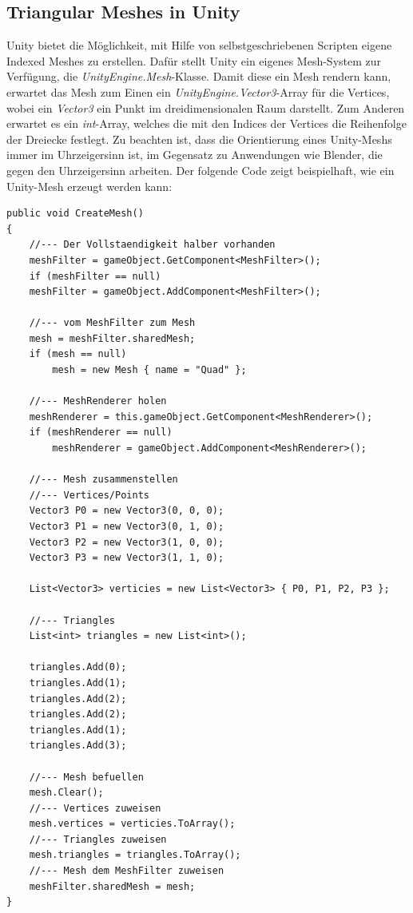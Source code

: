 \subsection{Triangular Meshes in Unity}
Unity bietet die M\"oglichkeit, mit Hilfe von selbstgeschriebenen Scripten eigene Indexed Meshes zu erstellen. Daf\"ur stellt Unity ein eigenes Mesh-System zur Verf\"ugung, die \textit{UnityEngine.Mesh}-Klasse. Damit diese ein Mesh rendern kann, erwartet das Mesh zum Einen ein \textit{UnityEngine.Vector3}-Array f\"ur die Vertices, wobei ein \textit{Vector3} ein Punkt im dreidimensionalen Raum darstellt. Zum Anderen erwartet es ein \textit{int}-Array, welches die mit den Indices der Vertices die Reihenfolge der Dreiecke festlegt. Zu beachten ist, dass die Orientierung eines Unity-Meshs immer im Uhrzeigersinn ist, im Gegensatz zu Anwendungen wie Blender, die gegen den Uhrzeigersinn arbeiten.  
Der folgende Code zeigt beispielhaft, wie ein Unity-Mesh erzeugt werden kann:\\
\begin{lstlisting}
public void CreateMesh()
{
	//--- Der Vollstaendigkeit halber vorhanden
	meshFilter = gameObject.GetComponent<MeshFilter>();
	if (meshFilter == null)
	meshFilter = gameObject.AddComponent<MeshFilter>();

	//--- vom MeshFilter zum Mesh
	mesh = meshFilter.sharedMesh;
	if (mesh == null)
		mesh = new Mesh { name = "Quad" };

	//--- MeshRenderer holen
	meshRenderer = this.gameObject.GetComponent<MeshRenderer>();
	if (meshRenderer == null)
		meshRenderer = gameObject.AddComponent<MeshRenderer>();

	//--- Mesh zusammenstellen
	//--- Vertices/Points
	Vector3 P0 = new Vector3(0, 0, 0);
	Vector3 P1 = new Vector3(0, 1, 0);
	Vector3 P2 = new Vector3(1, 0, 0);
	Vector3 P3 = new Vector3(1, 1, 0);

	List<Vector3> verticies = new List<Vector3> { P0, P1, P2, P3 };

	//--- Triangles
	List<int> triangles = new List<int>();

	triangles.Add(0);
	triangles.Add(1);
	triangles.Add(2);
	triangles.Add(2);
	triangles.Add(1);
	triangles.Add(3);

	//--- Mesh befuellen
	mesh.Clear();
	//--- Vertices zuweisen
	mesh.vertices = verticies.ToArray();
	//--- Triangles zuweisen
	mesh.triangles = triangles.ToArray();
	//--- Mesh dem MeshFilter zuweisen
	meshFilter.sharedMesh = mesh;
}
\end{lstlisting}

